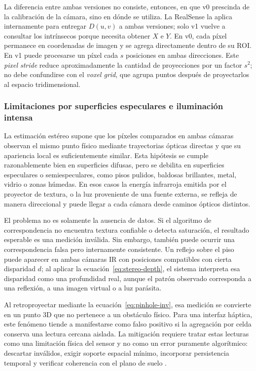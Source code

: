La diferencia entre ambas versiones no consiste, entonces, en que v0 prescinda de la
calibración de la cámara, sino en dónde se utiliza. La RealSense la aplica internamente para
entregar $D(u,v)$ a ambas versiones; solo v1 vuelve a consultar los intrínsecos porque necesita
obtener $X$ e $Y$. En v0, cada píxel permanece en coordenadas de imagen y se agrega
directamente dentro de su ROI. En v1 puede procesarse un píxel cada $s$ posiciones en ambas
direcciones. Este \emph{pixel stride} reduce
aproximadamente la cantidad de proyecciones por un factor $s^2$; no debe confundirse con el
\emph{voxel grid}, que agrupa puntos después de proyectarlos al espacio tridimensional.

\subsubsection{Limitaciones por superficies especulares e iluminación intensa}

La estimación estéreo supone que los píxeles comparados en ambas cámaras observan el mismo
punto físico mediante trayectorias ópticas directas y que su apariencia local es
suficientemente similar. Esta hipótesis se cumple razonablemente bien en superficies difusas,
pero se debilita en superficies especulares o semiespeculares, como pisos pulidos, baldosas
brillantes, metal, vidrio o zonas húmedas. En esos casos la energía infrarroja emitida por el
proyector de textura, o la luz proveniente de una fuente externa, se refleja de manera
direccional y puede llegar a cada cámara desde caminos ópticos distintos.

El problema no es solamente la ausencia de datos. Si el algoritmo de correspondencia no
encuentra textura confiable o detecta saturación, el resultado esperable es una medición
inválida. Sin embargo, también puede ocurrir una correspondencia falsa pero internamente
consistente. Un reflejo sobre el piso puede aparecer en ambas cámaras IR con posiciones
compatibles con cierta disparidad $d$; al aplicar la ecuación~\ref{eq:stereo-depth}, el
sistema interpreta esa disparidad como una profundidad real, aunque el patrón observado
corresponda a una reflexión, a una imagen virtual o a luz parásita.

Al retroproyectar mediante la ecuación~\ref{eq:pinhole-inv}, esa medición se convierte en un
punto 3D que no pertenece a un obstáculo físico. Para una interfaz háptica, este fenómeno
tiende a manifestarse como falso positivo si la agregación por celda conserva una lectura
cercana aislada. La mitigación requiere tratar estas lecturas como una limitación física del
sensor y no como un error puramente algorítmico: descartar inválidos, exigir soporte espacial
mínimo, incorporar persistencia temporal y verificar coherencia con el plano de suelo
\cite{RS-D400,IntelRealSenseDepthTuning}.

